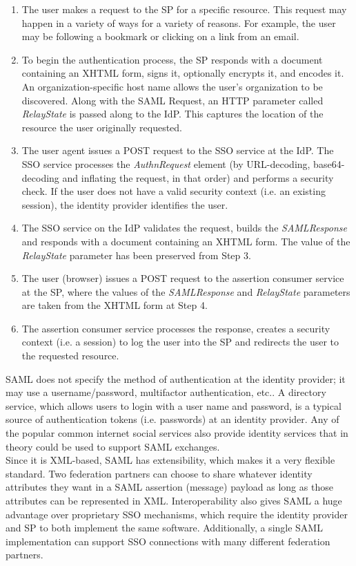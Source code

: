 \begin{enumerate}
\item The user makes a request to the SP for a specific resource. This request may happen in a variety of ways for a variety of reasons. For example, the user may be following a bookmark or clicking on a link from an email.
\item To begin the authentication process, the SP responds with a document containing an XHTML form, signs it, optionally encrypts it, and encodes it. An organization-specific host name allows the user's organization to be discovered. Along with the SAML Request, an HTTP parameter called \textit{RelayState} is passed along to the IdP. This captures the location of the resource the user originally requested.
\item The user agent issues a POST request to the SSO service at the IdP. The SSO service processes the \textit{AuthnRequest} element (by URL-decoding, base64-decoding and inflating the request, in that order) and performs a security check. If the user does not have a valid security context (i.e. an existing session), the identity provider identifies the user.
\item The SSO service on the IdP validates the request, builds the \textit{SAMLResponse} and responds with a document containing an XHTML form. The value of the \textit{RelayState} parameter has been preserved from Step 3.
\item The user (browser) issues a POST request to the assertion consumer service at the SP, where the values of the \textit{SAMLResponse} and \textit{RelayState} parameters are taken from the XHTML form at Step 4.
\item The assertion consumer service processes the response, creates a security context (i.e. a session) to log the user into the SP and redirects the user to the requested resource.
\end{enumerate}

SAML does not specify the method of authentication at the identity provider; it may use a username/password, multifactor authentication, etc.. A directory service, which allows users to login with a user name and password, is a typical source of authentication tokens (i.e. passwords) at an identity provider. Any of the popular common internet social services also provide identity services that in theory could be used to support SAML exchanges.\\

Since it is XML-based, SAML has extensibility, which makes it a very flexible standard. Two federation partners can choose to share whatever identity attributes they want in a SAML assertion (message) payload as long as those attributes can be represented in XML. Interoperability also gives SAML a huge advantage over proprietary SSO mechanisms, which require the identity provider and SP to both implement the same software. Additionally, a single SAML implementation can support SSO connections with many different federation partners.\\

